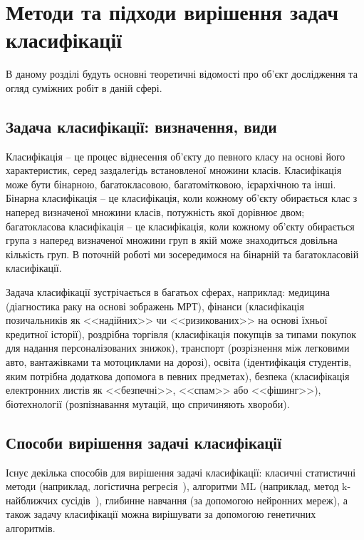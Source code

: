 
\chapter{Методи та підходи вирішення задач класифікації}
\label{chap:review}  %

В даному розділі будуть основні теоретичні відомості про об'єкт дослідження та огляд суміжних робіт в даній сфері.

\section{Задача класифікації: визначення, види}

Класифікація -- це процес віднесення об'єкту до певного класу на основі його характеристик, серед заздалегідь встановленої множини класів. Класифікація може бути бінарною, багатокласовою, багатомітковою, ієрархічною та інші. Бінарна класифікація -- це класифікація, коли кожному об'єкту обирається клас з наперед визначеної множини класів, потужність якої дорівнює двом; багатокласова класифікація -- це класифікація, коли кожному об'єкту обирається група з наперед визначеної множини груп в якій може знаходиться довільна кількість груп. В поточній роботі ми зосередимося на бінарній та багатокласовій класифікації.

Задача класифікації зустрічається в багатьох сферах, наприклад: медицина (діагностика раку на основі зображень МРТ), фінанси (класифікація позичальників як <<надійних>> чи <<ризикованих>> на основі їхньої кредитної історії), роздрібна торгівля (класифікація покупців за типами покупок для надання персоналізованих знижок), транспорт (розрізнення між легковими авто, вантажівками та мотоциклами на дорозі), освіта (ідентифікація студентів, яким потрібна додаткова допомога в певних предметах), безпека (класифікація електронних листів як <<безпечні>>, <<спам>> або <<фішинг>>), біотехнології (розпізнавання мутацій, що спричиняють хвороби). 

\section{Способи вирішення задачі класифікації}\label{sec:methods_of_solving_the_classification_problem}

Існує декілька способів для вирішення задачі класифікації: класичні статистичні методи (наприклад, логістична регресія~\cite{ct1}), алгоритми ML (наприклад, метод k-найближчих сусідів~\cite{ct4}), глибинне навчання (за допомогою нейронних мереж), а також задачу класифікації можна вирішувати за допомогою генетичних алгоритмів.

